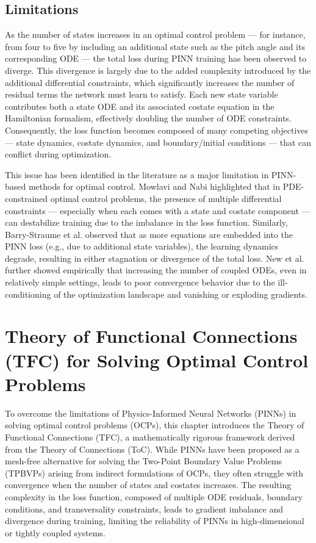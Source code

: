 \documentclass[
  number,
  preprint]{elsarticle}
\begin{document}
\subsection{Limitations}\label{limitations}

As the number of states increases in an optimal control problem --- for
instance, from four to five by including an additional state such as the
pitch angle and its corresponding ODE --- the total loss during PINN
training has been observed to diverge. This divergence is largely due to
the added complexity introduced by the additional differential
constraints, which significantly increases the number of residual terms
the network must learn to satisfy. Each new state variable contributes
both a state ODE and its associated costate equation in the Hamiltonian
formalism, effectively doubling the number of ODE constraints.
Consequently, the loss function becomes composed of many competing
objectives --- state dynamics, costate dynamics, and boundary/initial
conditions --- that can conflict during optimization.

This issue has been identified in the literature as a major limitation
in PINN-based methods for optimal control. Mowlavi and Nabi
\citep{mowlavi2022} highlighted that in PDE-constrained optimal control
problems, the presence of multiple differential constraints ---
especially when each comes with a state and costate component --- can
destabilize training due to the imbalance in the loss function.
Similarly, Barry-Straume et al. \citep{barry2022controlpinns} observed
that as more equations are embedded into the PINN loss (e.g., due to
additional state variables), the learning dynamics degrade, resulting in
either stagnation or divergence of the total loss. New et al.
\citep{new2022} further showed empirically that increasing the number of
coupled ODEs, even in relatively simple settings, leads to poor
convergence behavior due to the ill-conditioning of the optimization
landscape and vanishing or exploding gradients.

\newpage

\section{Theory of Functional Connections (TFC) for Solving Optimal
Control
Problems}\label{theory-of-functional-connections-tfc-for-solving-optimal-control-problems}

To overcome the limitations of Physics-Informed Neural Networks (PINNs)
in solving optimal control problems (OCPs), this chapter introduces the
Theory of Functional Connections \citep{mortari2017least} (TFC), a
mathematically rigorous framework derived from the Theory of Connections
(ToC). While PINNs have been proposed as a mesh-free alternative for
solving the Two-Point Boundary Value Problems (TPBVPs) arising from
indirect formulations of OCPs, they often struggle with convergence when
the number of states and costates increases. The resulting complexity in
the loss function, composed of multiple ODE residuals, boundary
conditions, and transversality constraints, leads to gradient imbalance
and divergence during training, limiting the reliability of PINNs in
high-dimensional or tightly coupled systems.
\end{document}
